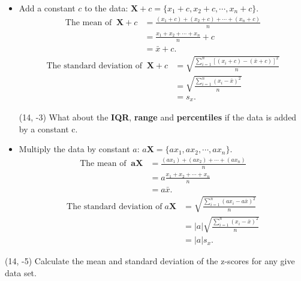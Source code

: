 \documentclass[a4paper, 12pt,twoside]{book}
\begin{document}
\begin{itemize}
\item Add a constant $c$ to the data: 
$\mathbf{X}+c = \{x_1+c, x_2+c, \cdots, x_n+c\}.$
\begin{equation*}
\begin{split}
\text{The mean of}\;\;\mathbf{X}+c &= \frac{(x_1+c)+(x_2+c)+\cdots+(x_n+c)}{n}\\
&= \frac{x_1+x_2+\cdots+x_n}{n}+ c\\
&= \bar{x} + c.
\end{split}
\end{equation*}
\begin{equation*}
\begin{split}
\text{The standard deviation of}\;\;\mathbf{X}+c &= \sqrt{\frac{\sum_{i=1}^n[(x_i+c)-(\bar{x}+c)]^2}{n}}\\
&= \sqrt{\frac{\sum_{i=1}^n(x_i-\bar{x})^2}{n}}\\
&= s_x.
\end{split}
\end{equation*}

\begin{textblock}{4.5}(14, -3)
What about the \textbf{IQR}, \textbf{range} and \textbf{percentiles} if the data is added by a constant c.
\end{textblock}
\hspace{0.3cm}

\item Multiply the data by constant $a$: 
$a\mathbf{X} = \{ax_1, ax_2, \cdots, ax_n\}.$
\begin{equation*}
\begin{split}
\text{The mean of}\;\;\mathbf{aX} &= \frac{(ax_1)+(ax_2)+\cdots+(ax_n)}{n}\\
&= a\frac{x_1+x_2+\cdots+x_n}{n}\\
&= a\bar{x}.
\end{split}
\end{equation*}
\begin{equation*}
\begin{split}
\text{The standard deviation of}\;a\mathbf{X}&= \sqrt{\frac{\sum_{i=1}^n(ax_i-a\bar{x})^2}{n}}\\
&= |a|\sqrt{\frac{\sum_{i=1}^n(x_i-\bar{x})^2}{n}}\\
&= |a|s_x.
\end{split}
\end{equation*}
\end{itemize}

\begin{textblock}{4.5}(14, -5)
Calculate the mean and standard deviation of the z-scores for any give data set.
\end{textblock}
\end{document}
